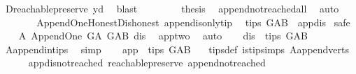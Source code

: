 \begin{isabellebody}
\ D{}{\isachardot}{\kern0pt}reachable{}{\isacharunderscore}{\kern0pt}preserve\ y{\isacharunderscore}{\kern0pt}d\ \isamarkupfalse%
\ blast\ \isanewline
\ \ \ \ \isamarkupfalse%
\ \isamarkupfalse%
\ {\isacharquery}{\kern0pt}thesis\ \isamarkupfalse%
\ append{\isacharunderscore}{\kern0pt}not{\isacharunderscore}{\kern0pt}reached{\isacharunderscore}{\kern0pt}all\ \isamarkupfalse%
\ auto\isanewline
\ \ \isamarkupfalse%
\ \isanewline
{}\isamarkupfalse%
%
\endisatagproof
{\isafoldproof}%
%
\isadelimproof
\ \ \ \isanewline
%
\endisadelimproof
\isanewline
\isanewline
{}\isamarkupfalse%
\ {\isacharparenleft}{\kern0pt}\ Append{\isacharunderscore}{\kern0pt}One{\isacharunderscore}{\kern0pt}Honest{\isacharunderscore}{\kern0pt}Dishonest{\isacharparenright}{\kern0pt}\ append{\isacharunderscore}{\kern0pt}is{\isacharunderscore}{\kern0pt}only{\isacharunderscore}{\kern0pt}tip{\isacharcolon}{\kern0pt}\isanewline
\ \ {\isachardoublequoteopen}tips\ G{\isacharunderscore}{\kern0pt}AB\ {\isacharequal}{\kern0pt}\ {\isacharbraceleft}{\kern0pt}app{\isacharcomma}{\kern0pt}dis{\isacharbraceright}{\kern0pt}{\isachardoublequoteclose}\isanewline
%
\isadelimproof
%
\endisadelimproof
%
\isatagproof
{}\isamarkupfalse%
\ safe\isanewline
\ \ \isamarkupfalse%
\ A{}{\isacharcolon}{\kern0pt}\ Append{\isacharunderscore}{\kern0pt}One\ G{\isacharunderscore}{\kern0pt}A\ G{\isacharunderscore}{\kern0pt}AB\ dis\ \isamarkupfalse%
\ app{\isacharunderscore}{\kern0pt}two\ \isamarkupfalse%
\ auto\isanewline
\ \ \isamarkupfalse%
\ {\isachardoublequoteopen}dis\ {\isasymin}\ tips\ G{\isacharunderscore}{\kern0pt}AB\ {\isachardoublequoteclose}\ \isamarkupfalse%
\ A{}{\isachardot}{\kern0pt}append{\isacharunderscore}{\kern0pt}in{\isacharunderscore}{\kern0pt}tips\ \isamarkupfalse%
\ simp\isanewline
\ \ \isamarkupfalse%
\ {\isachardoublequoteopen}app\ {\isasymin}\ tips\ G{\isacharunderscore}{\kern0pt}AB\ {\isachardoublequoteclose}\ \isamarkupfalse%
\ tips{\isacharunderscore}{\kern0pt}def\ is{\isacharunderscore}{\kern0pt}tip{\isachardot}{\kern0pt}simps\ A{}{\isachardot}{\kern0pt}append{\isacharunderscore}{\kern0pt}verts\isanewline
\ \ \ \ \isamarkupfalse%
\ app{\isacharunderscore}{\kern0pt}dis{\isacharunderscore}{\kern0pt}not{\isacharunderscore}{\kern0pt}reached\ reachable{}{\isacharunderscore}{\kern0pt}preserve\ append{\isacharunderscore}{\kern0pt}not{\isacharunderscore}{\kern0pt}reached\isanewline

\end{isabellebody}
